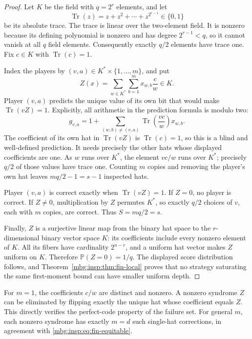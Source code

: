 \documentclass[11pt,letterpaper]{article}
\theoremstyle{definition}
\newcommand{\Prb}{\mathbb P}
\begin{document}
\begin{proof}
Let $K$ be the field with $q=2^r$ elements, and let
\[
 \operatorname{Tr}(z)=z+z^2+\cdots+z^{2^{r-1}}\in\{0,1\}
\]
be its absolute trace.  The trace is linear over the two-element field.
It is nonzero because its defining polynomial is nonzero and has
degree $2^{r-1}<q$, so it cannot vanish at all $q$ field elements.
Consequently exactly $q/2$ elements have trace one.  Fix
$c\in K$ with $\operatorname{Tr}(c)=1$.

Index the players by $(v,a)\in K^*\times\{1,\ldots,m\}$, and put
\[
 Z(x)=\sum_{w\in K^*}\sum_{b=1}^m x_{w,b}\frac{c}{w}\in K.
\]
Player $(v,a)$ predicts the unique value of its own bit that would make
$\operatorname{Tr}(vZ)=1$.  Explicitly, all arithmetic in the prediction
formula is modulo two:
\begin{equation}
 g_{v,a}=1+
 \sum_{(w,b)\ne(v,a)}
    \operatorname{Tr}\!\left(\frac{vc}{w}\right)x_{w,b}.
 \label{mbg:insp:eq:fin-trace-rule}
\end{equation}
The coefficient of its own hat in $\operatorname{Tr}(vZ)$ is
$\operatorname{Tr}(c)=1$, so this is a blind and well-defined prediction.
It needs precisely the other hats whose displayed coefficients are one.
As $w$ runs over $K^*$, the element $vc/w$ runs over $K^*$; precisely
$q/2$ of those values have trace one.  Counting $m$ copies and removing
the player's own hat leaves $mq/2-1=s-1$ inspected hats.

Player $(v,a)$ is correct exactly when $\operatorname{Tr}(vZ)=1$.
If $Z=0$, no player is correct.  If $Z\ne0$, multiplication by $Z$
permutes $K^*$, so exactly $q/2$ choices of $v$, each with $m$ copies,
are correct.  Thus $S=mq/2=s$.

Finally, $Z$ is a surjective linear map from the binary hat space to
the $r$-dimensional binary vector space $K$: its coefficients include
every nonzero element of $K$.  All its fibers have cardinality
$2^{n-r}$, and a uniform hat vector makes $Z$ uniform on $K$.
Therefore $\Prb(Z=0)=1/q$.  The displayed score distribution follows,
and Theorem~\ref{mbg:insp:thm:fin-local} proves that no strategy saturating the
same first-moment bound can have smaller uniform depth.
\end{proof}

For $m=1$, the coefficients $c/w$ are distinct and nonzero.  A nonzero
syndrome $Z$ can be eliminated by flipping exactly the unique hat whose
coefficient equals $Z$.  This directly verifies the perfect-code
property of the failure set.  For general $m$, each nonzero syndrome
has exactly $m=d$ such single-hat corrections, in agreement with
\eqref{mbg:insp:eq:fin-equitable}.
\end{document}
